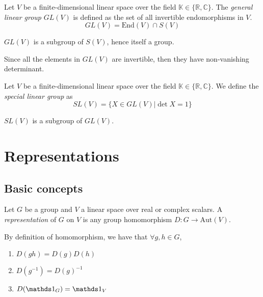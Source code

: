 \begin{definition}[$GL(V)$]
    Let $V$ be a finite-dimensional linear space over the field $\mathbb{K} \in \{\mathbb{R}, \mathbb{C}\}$. The \emph{general linear group} $GL(V)$ is defined as the set of all invertible endomorphisms in $V$.
    \begin{equation*}
        GL(V) = \text{End}(V) \cap S(V)
    \end{equation*}
\end{definition}
\begin{proposition}
    $GL(V)$ is a subgroup of $S(V)$, hence itself a group.
\end{proposition}

\begin{remark}
    Since all the elements in $GL(V)$ are invertible, then they have non-vanishing determinant.
\end{remark}


\begin{definition}[$SL(V)$]
    Let $V$ be a finite-dimensional linear space over the field $\mathbb{K} \in \{\mathbb{R}, \mathbb{C}\}$. We define the \emph{special linear group} as
    \begin{equation*}
        SL(V) = \{X \in GL(V) | \det X = 1\}
    \end{equation*}
\end{definition}
\begin{proposition}
    $SL(V)$ is a subgroup of $GL(V)$.
\end{proposition}







\section{Representations}

\subsection{Basic concepts}


\begin{definition}[Representation]
    Let $G$ be a group and $V$ a linear space over real or complex scalars. A \emph{representation} of $G$ on $V$ is any group homomorphism $D: G \rightarrow \text{Aut}(V)$.
\end{definition}
\begin{remark}
    By definition of homomorphism, we have that $\forall g, h \in G$,
    \begin{enumerate}
        \item $D(gh) = D(g) D(h)$
        \item $D(g^{-1}) = D(g)^{-1}$
        \item $D(\idop_G) = \idop_V$
    \end{enumerate}
\end{remark}


